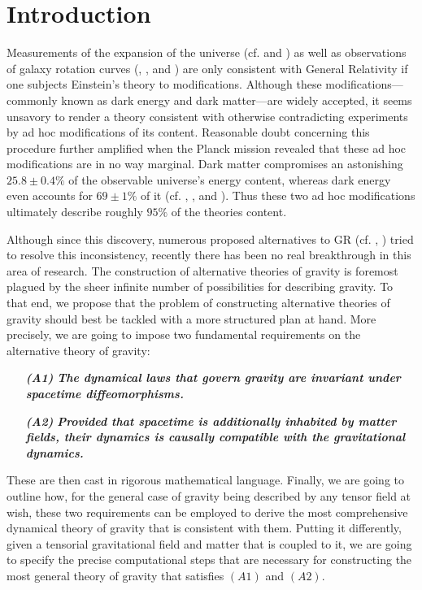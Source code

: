 \documentclass[%
preprint,
titlepage,
nofootinbib,
amsmath,amssymb,
showkeys,
aps,
prd,
floatfix,
]{revtex4-2}
\begin{document}
\section{Introduction}
Measurements of the expansion of the universe (cf. \cite{1999ApJ...517..565P} and \cite{1998AJ....116.1009R}) as well as observations of galaxy rotation curves (\cite{1970ApJ...160..811F}, \cite{1970ApJ...159..379R}, and \cite{1980ApJ...238..471R}) are only consistent with General Relativity if one subjects Einstein's theory to modifications. Although these modifications---commonly known as dark energy and dark matter---are widely accepted, it seems unsavory to render a theory consistent with otherwise contradicting experiments by ad hoc modifications of its content. Reasonable doubt concerning this procedure further amplified when the Planck mission revealed that these ad hoc modifications are in no way marginal. Dark matter compromises an astonishing $ 25.8\pm0.4\%$ of the observable universe's energy content, whereas dark energy even accounts for $ 69 \pm 1 \%$ of it (cf. \cite{Planck13_1}, \cite{Planck13_2}, \cite{Planck15} and \cite{Planck18}). Thus these two ad hoc modifications ultimately describe roughly $95\%$ of the theories content. 

Although since this discovery, numerous proposed alternatives to GR (cf. \cite{2013LRR....16....9Y}, \cite{fR2}) tried to resolve this inconsistency, recently there has been no real breakthrough in this area of research. The construction of alternative theories of gravity is foremost plagued by the sheer infinite number of possibilities for describing gravity. To that end, we propose that the problem of constructing alternative theories of gravity should best be tackled with a more structured plan at hand.
More precisely, we are going to impose two fundamental requirements on the alternative theory of gravity: 
\begin{itemize}
    \item[\textbf{\textit{(A1)}}] \textbf{\textit{The dynamical laws that govern gravity are invariant under spacetime diffeomorphisms.}}
    \item[\textbf{\textit{(A2)}}] \textbf{\textit{Provided that spacetime is additionally inhabited by matter fields, their dynamics is causally compatible with the gravitational dynamics.}}
\end{itemize}
These are then cast in rigorous mathematical language.
Finally, we are going to outline how, for the general case of gravity being described by any tensor field at wish, these two requirements can be employed to derive the most comprehensive dynamical theory of gravity that is consistent with them.
Putting it differently, given a tensorial gravitational field and matter that is coupled to it, we are going to specify the precise computational steps that are necessary for constructing the most general theory of gravity that satisfies $(A1)$ and $(A2)$.
\end{document}
